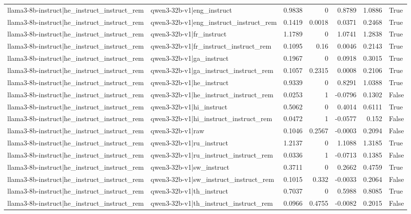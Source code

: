 \begin{table}
\begin{tabular}{l l r r r r l}
llama3-8b-instruct|he_instruct_instruct_rem & qwen3-32b-v1|eng_instruct & 0.9838 & 0 & 0.8789 & 1.0886 & True \\
llama3-8b-instruct|he_instruct_instruct_rem & qwen3-32b-v1|eng_instruct_instruct_rem & 0.1419 & 0.0018 & 0.0371 & 0.2468 & True \\
llama3-8b-instruct|he_instruct_instruct_rem & qwen3-32b-v1|fr_instruct & 1.1789 & 0 & 1.0741 & 1.2838 & True \\
llama3-8b-instruct|he_instruct_instruct_rem & qwen3-32b-v1|fr_instruct_instruct_rem & 0.1095 & 0.16 & 0.0046 & 0.2143 & True \\
llama3-8b-instruct|he_instruct_instruct_rem & qwen3-32b-v1|ga_instruct & 0.1967 & 0 & 0.0918 & 0.3015 & True \\
llama3-8b-instruct|he_instruct_instruct_rem & qwen3-32b-v1|ga_instruct_instruct_rem & 0.1057 & 0.2315 & 0.0008 & 0.2106 & True \\
llama3-8b-instruct|he_instruct_instruct_rem & qwen3-32b-v1|he_instruct & 0.9339 & 0 & 0.8291 & 1.0388 & True \\
llama3-8b-instruct|he_instruct_instruct_rem & qwen3-32b-v1|he_instruct_instruct_rem & 0.0253 & 1 & -0.0796 & 0.1302 & False \\
llama3-8b-instruct|he_instruct_instruct_rem & qwen3-32b-v1|hi_instruct & 0.5062 & 0 & 0.4014 & 0.6111 & True \\
llama3-8b-instruct|he_instruct_instruct_rem & qwen3-32b-v1|hi_instruct_instruct_rem & 0.0472 & 1 & -0.0577 & 0.152 & False \\
llama3-8b-instruct|he_instruct_instruct_rem & qwen3-32b-v1|raw & 0.1046 & 0.2567 & -0.0003 & 0.2094 & False \\
llama3-8b-instruct|he_instruct_instruct_rem & qwen3-32b-v1|ru_instruct & 1.2137 & 0 & 1.1088 & 1.3185 & True \\
llama3-8b-instruct|he_instruct_instruct_rem & qwen3-32b-v1|ru_instruct_instruct_rem & 0.0336 & 1 & -0.0713 & 0.1385 & False \\
llama3-8b-instruct|he_instruct_instruct_rem & qwen3-32b-v1|sw_instruct & 0.3711 & 0 & 0.2662 & 0.4759 & True \\
llama3-8b-instruct|he_instruct_instruct_rem & qwen3-32b-v1|sw_instruct_instruct_rem & 0.1015 & 0.332 & -0.0033 & 0.2064 & False \\
llama3-8b-instruct|he_instruct_instruct_rem & qwen3-32b-v1|th_instruct & 0.7037 & 0 & 0.5988 & 0.8085 & True \\
llama3-8b-instruct|he_instruct_instruct_rem & qwen3-32b-v1|th_instruct_instruct_rem & 0.0966 & 0.4755 & -0.0082 & 0.2015 & False \\

\end{tabular}
\end{table}
